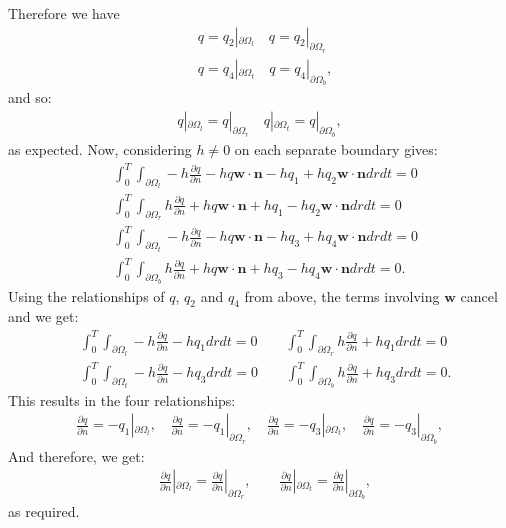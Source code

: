 \documentclass[11pt, a4paper]{article}
\theoremstyle{definition}
\newcommand{\w}{\mathbf{w}}
\newcommand{\n}{\mathbf{n}}
\begin{document}
	Therefore we have 
	\begin{align*}
		&q = q_2 |_{\partial \Omega_l} \quad q =  q_2 |_{\partial \Omega_r}\\
		&q = q_4 |_{\partial \Omega_t} \quad q =  q_4 |_{\partial \Omega_b},
	\end{align*}
	and so:
	\begin{align*}
		q |_{\partial \Omega_l} = q |_{\partial \Omega_r} \quad q |_{\partial \Omega_t} = q|_{\partial \Omega_b},
	\end{align*}
	as expected.
	Now, considering $h \neq 0$ on each separate boundary gives:
	\begin{align*}
		&\int_0^T \int_{\partial \Omega_l} - h \frac{\partial q}{\partial n}  - h q \w \cdot \n - h q_1 + h q_2 \w \cdot \n dr dt = 0\\
		&\int_0^T \int_{\partial \Omega_r}  h \frac{\partial q}{\partial n}  + h q \w \cdot \n + h q_1 - h q_2 \w \cdot \n dr dt = 0 \\
		&\int_0^T \int_{\partial \Omega_t}- h \frac{\partial q}{\partial n}  - h q \w \cdot \n - h q_3 + h q_4 \w \cdot \n dr dt = 0 \\
		&\int_0^T \int_{\partial \Omega_b} h \frac{\partial q}{\partial n}  + h q \w \cdot \n + h q_3 - h q_4 \w \cdot \n dr dt = 0 .
	\end{align*}
	Using the relationships of $q$, $q_2$ and $q_4$ from above, the terms involving $\w$ cancel and we get:
	\begin{align*}
		&\int_0^T \int_{\partial \Omega_l} - h \frac{\partial q}{\partial n}   - h q_1 dr dt = 0 \qquad \int_0^T \int_{\partial \Omega_r}  h \frac{\partial q}{\partial n}  + h q_1 dr dt = 0 \\
		&\int_0^T \int_{\partial \Omega_t}- h \frac{\partial q}{\partial n}   - h q_3 dr dt = 0 \qquad
		\int_0^T \int_{\partial \Omega_b} h \frac{\partial q}{\partial n}   + h q_3  dr dt = 0 .
	\end{align*}
	This results in the four relationships:
	\begin{align*}
		\frac{\partial q}{\partial n} = - q_1 |_{\partial \Omega_l}, \quad \frac{\partial q}{\partial n} = - q_1 |_{\partial \Omega_r}, \quad
		\frac{\partial q}{\partial n} = - q_3 |_{\partial \Omega_t}, \quad
		\frac{\partial q}{\partial n} = - q_3 |_{\partial \Omega_b},
	\end{align*}
	And therefore, we get:
	\begin{align*}
		&\frac{\partial q}{\partial n}|_{\partial \Omega_l} = \frac{\partial q}{\partial n}|_{\partial \Omega_r}, \qquad \frac{\partial q}{\partial n}|_{\partial \Omega_t} = \frac{\partial q}{\partial n}|_{\partial \Omega_b},
	\end{align*}
	as required.
	
\end{document}
